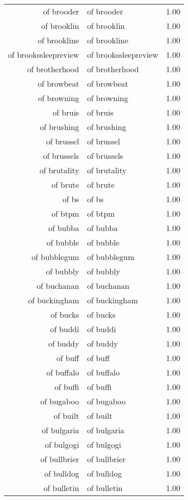 \begin{table}[ht]
\begin{tabular}{rlr}
  of brooder & of brooder & 1.00 \\ 
  of brooklin & of brooklin & 1.00 \\ 
  of brookline & of brookline & 1.00 \\ 
  of brookssleepreview & of brookssleepreview & 1.00 \\ 
  of brotherhood & of brotherhood & 1.00 \\ 
  of browbeat & of browbeat & 1.00 \\ 
  of browning & of browning & 1.00 \\ 
  of bruis & of bruis & 1.00 \\ 
  of brushing & of brushing & 1.00 \\ 
  of brussel & of brussel & 1.00 \\ 
  of brussels & of brussels & 1.00 \\ 
  of brutality & of brutality & 1.00 \\ 
  of brute & of brute & 1.00 \\ 
  of bs & of bs & 1.00 \\ 
  of btpm & of btpm & 1.00 \\ 
  of bubba & of bubba & 1.00 \\ 
  of bubble & of bubble & 1.00 \\ 
  of bubblegum & of bubblegum & 1.00 \\ 
  of bubbly & of bubbly & 1.00 \\ 
  of buchanan & of buchanan & 1.00 \\ 
  of buckingham & of buckingham & 1.00 \\ 
  of bucks & of bucks & 1.00 \\ 
  of buddi & of buddi & 1.00 \\ 
  of buddy & of buddy & 1.00 \\ 
  of buff & of buff & 1.00 \\ 
  of buffalo & of buffalo & 1.00 \\ 
  of buffi & of buffi & 1.00 \\ 
  of bugaboo & of bugaboo & 1.00 \\ 
  of built & of built & 1.00 \\ 
  of bulgaria & of bulgaria & 1.00 \\ 
  of bulgogi & of bulgogi & 1.00 \\ 
  of bullbrier & of bullbrier & 1.00 \\ 
  of bulldog & of bulldog & 1.00 \\ 
  of bulletin & of bulletin & 1.00 \\ 

\end{tabular}
\end{table}
